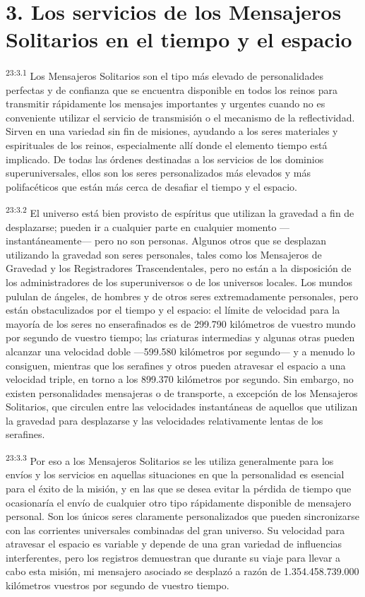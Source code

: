 \section*{3. Los servicios de los Mensajeros Solitarios en el tiempo y el espacio}
\par
\textsuperscript{23:3.1} Los Mensajeros Solitarios son el tipo más elevado de personalidades perfectas y de confianza que se encuentra disponible en todos los reinos para transmitir rápidamente los mensajes importantes y urgentes cuando no es conveniente utilizar el servicio de transmisión o el mecanismo de la reflectividad. Sirven en una variedad sin fin de misiones, ayudando a los seres materiales y espirituales de los reinos, especialmente allí donde el elemento tiempo está implicado. De todas las órdenes destinadas a los servicios de los dominios superuniversales, ellos son los seres personalizados más elevados y más polifacéticos que están más cerca de desafiar el tiempo y el espacio.

\par
\textsuperscript{23:3.2} El universo está bien provisto de espíritus que utilizan la gravedad a fin de desplazarse; pueden ir a cualquier parte en cualquier momento ---instantáneamente--- pero no son personas. Algunos otros que se desplazan utilizando la gravedad son seres personales, tales como los Mensajeros de Gravedad y los Registradores Trascendentales, pero no están a la disposición de los administradores de los superuniversos o de los universos locales. Los mundos pululan de ángeles, de hombres y de otros seres extremadamente personales, pero están obstaculizados por el tiempo y el espacio: el límite de velocidad para la mayoría de los seres no enserafinados es de 299.790 kilómetros de vuestro mundo por segundo de vuestro tiempo; las criaturas intermedias y algunas otras pueden alcanzar una velocidad doble ---599.580 kilómetros por segundo--- y a menudo lo consiguen, mientras que los serafines y otros pueden atravesar el espacio a una velocidad triple, en torno a los 899.370 kilómetros por segundo. Sin embargo, no existen personalidades mensajeras o de transporte, a excepción de los Mensajeros Solitarios, que circulen entre las velocidades instantáneas de aquellos que utilizan la gravedad para desplazarse y las velocidades relativamente lentas de los serafines.

\par
\textsuperscript{23:3.3} Por eso a los Mensajeros Solitarios se les utiliza generalmente para los envíos y los servicios en aquellas situaciones en que la personalidad es esencial para el éxito de la misión, y en las que se desea evitar la pérdida de tiempo que ocasionaría el envío de cualquier otro tipo rápidamente disponible de mensajero personal. Son los únicos seres claramente personalizados que pueden sincronizarse con las corrientes universales combinadas del gran universo. Su velocidad para atravesar el espacio es variable y depende de una gran variedad de influencias interferentes, pero los registros demuestran que durante su viaje para llevar a cabo esta misión, mi mensajero asociado se desplazó a razón de 1.354.458.739.000 kilómetros vuestros por segundo de vuestro tiempo.


